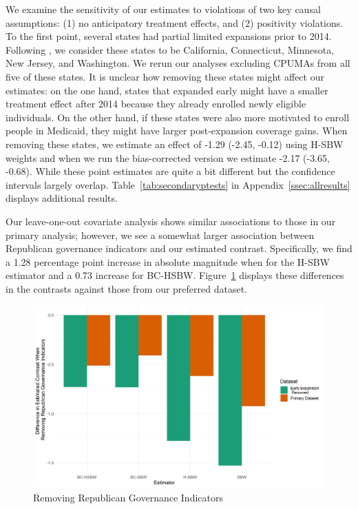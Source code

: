 \documentclass[12pt]{article}
\begin{document}
We examine the sensitivity of our estimates to violations of two key causal assumptions: (1) no anticipatory treatment effects, and (2) positivity violations. To the first point, several states had partial limited expansions prior to 2014. Following \cite{frean2017premium}, we consider these states to be California, Connecticut, Minnesota, New Jersey, and Washington. We rerun our analyses excluding CPUMAs from all five of these states. It is unclear how removing these states might affect our estimates: on the one hand, states that expanded early might have a smaller treatment effect after 2014 because they already enrolled newly eligible individuals. On the other hand, if these states were also more motivated to enroll people in Medicaid, they might have larger post-expansion coverage gains. When removing these states, we estimate an effect of -1.29 (-2.45, -0.12) using H-SBW weights and when we run the bias-corrected version we estimate -2.17 (-3.65, -0.68). While these point estimates are quite a bit different but the confidence intervals largely overlap. Table~\ref{tab:secondaryptests} in Appendix~\ref{ssec:allresults} displays additional results. 

Our leave-one-out covariate analysis shows similar associations to those in our primary analysis; however, we see a somewhat larger association between Republican governance indicators and our estimated contrast. Specifically, we find a 1.28 percentage point increase in absolute magnitude when for the H-SBW estimator and a 0.73 increase for BC-HSBW. Figure~\ref{fig:repub} displays these differences in the contrasts against those from our preferred dataset. 

\begin{figure}[]
\begin{center}
    \includegraphics[scale=0.6]{01_Plots/repub-diff-c1c2.png}
    \caption{Removing Republican Governance Indicators}
    \label{fig:repub}
\end{center}
\end{figure}
\end{document}
